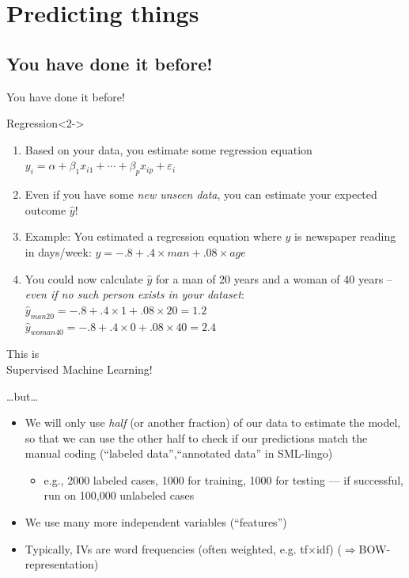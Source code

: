 \documentclass[compress]{beamer}
\begin{document}
\section{Predicting things}






\subsection{You have done it before!}
\begin{frame}{You have done it before!}
	\begin{block}{Regression}<2->
		\begin{enumerate}
			\item<3-> Based on your data, you estimate some regression equation 	$y_i = \alpha + \beta_1 x_{i1} + \cdots + \beta_p x_{ip} + \varepsilon_i$
			\item<4-> Even if you have some \emph{new unseen data}, you can estimate your expected outcome $\hat{y}$!
			\item<5-> Example: You estimated a regression equation where $y$ is newspaper reading in days/week: $y = -.8 + .4 \times man + .08 \times age$
			\item<6-> You could now calculate $\hat{y}$ for a man of 20 years and a woman of 40 years -- \emph{even if no such person exists in your dataset}: \\
			$\hat{y}_{man20} = -.8 + .4 \times 1 + .08 \times 20 = 1.2$ \\
			$\hat{y}_{woman40} = -.8 + .4 \times 0 + .08 \times 40 = 2.4$
		\end{enumerate}
	\end{block}	
	
\end{frame}



\begin{frame}{}
	\huge{This is\\ Supervised Machine Learning!}
\end{frame}

\begin{frame}{\ldots but\ldots}
	\begin{itemize}
		\item<1-> We will only use \emph{half} {\tiny{(or another fraction)}} of our data to estimate the model, so that we can use the other half to check if our predictions match the manual coding (``labeled data'',``annotated data'' in SML-lingo)
		\begin{itemize}
			\item<2->e.g., 2000 labeled cases, 1000 for training, 1000 for testing --- if successful, run on 100,000 unlabeled cases
		\end{itemize}
		\item<3-> We use many more independent variables (``features'')
		\item<4-> Typically, IVs are word frequencies (often weighted, e.g. tf$\times$idf) ($\Rightarrow$BOW-representation)
	\end{itemize}
\end{frame}
\end{document}
